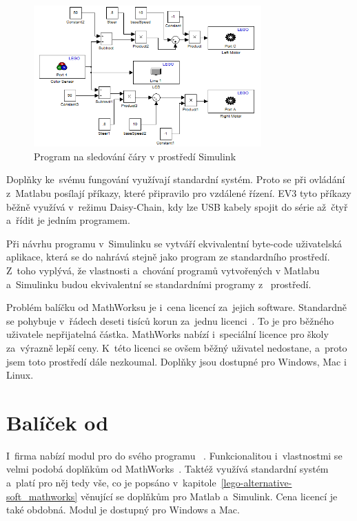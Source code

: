 \begin{figure}[h]
	\centering
	\includegraphics[width=330px]{images/mathworks-simulink_line-tracking-model.png}
	\caption[Program na sledování čáry v prostředí Simulink]{Program na sledování čáry v prostředí Simulink\protect\footnotemark}
	\label{fig:mathworks-simulink_line-tracking-model}
\end{figure}


Doplňky ke~svému fungování využívají standardní \lego{} systém. 
Proto se při ovládání  z~Matlabu posílají příkazy, které \lego{} připravilo pro vzdálené řízení. 
EV3 tyto příkazy běžně využívá v~režimu Daisy-Chain, kdy lze USB kabely spojit do série až~čtyř  a~řídit je jedním programem.     

Při návrhu programu v~Simulinku se vytváří ekvivalentní byte-code uživatelská aplikace, která se do  nahrává stejně jako program ze standardního \lego{} prostředí. 
Z~toho vyplývá, že vlastnosti a~chování programů vytvořených v Matlabu a~Simulinku budou ekvivalentní se standardními programy z~\lego{} prostředí.

Problém balíčku od MathWorksu je i~cena licencí za~jejich software. 
Standardně se pohybuje v~řádech deseti tisíců korun za~jednu licenci~\cite{legoProgramingPlatform_MathWork_Humusoft-price}.
To je pro běžného uživatele nepřijatelná částka. 
MathWorks nabízí i~speciální licence pro školy za~výrazně lepší ceny. 
K~této licenci se ovšem běžný uživatel nedostane, a~proto jsem toto prostředí dále nezkoumal.
Doplňky jsou dostupné pro Windows, Mac i  Linux. 
 

\section{Balíček od \NI}

I~firma \NI{} nabízí modul pro \legoM{} do svého programu \labview{}~\cite{legoProgramingPlatform_NI_LabVIEW}. 
Funkcionalitou i~vlastnostmi se velmi podobá doplňkům od MathWorks~\cite{garber2015learning}.
Taktéž využívá standardní \lego{} systém a~platí pro něj tedy vše, co je popsáno v~kapitole~\ref{lego-alternative-soft_mathworks} věnující se doplňkům pro Matlab a~Simulink. 
Cena licencí je také obdobná. Modul je dostupný pro Windows a Mac. 


